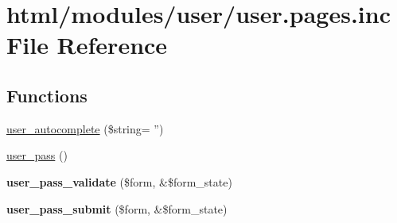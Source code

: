 \hypertarget{user_8pages_8inc}{
\section{html/modules/user/user.pages.inc File Reference}
\label{user_8pages_8inc}
}
\subsection*{Functions}
\begin{DoxyCompactItemize}
\item 
\hyperlink{user_8pages_8inc_a3a77600d6ab7b9af11a3692207b5533a}{user\_\-autocomplete} (\$string= '')
\item 
\hyperlink{group__forms_gad7f952e136ebcff493ca8de7209100cf}{user\_\-pass} ()
\item 
\hypertarget{user_8pages_8inc_a518f9714e8a92fe4ad96560928dba138}{
{\bfseries user\_\-pass\_\-validate} (\$form, \&\$form\_\-state)}
\label{user_8pages_8inc_a518f9714e8a92fe4ad96560928dba138}

\item 
\hypertarget{user_8pages_8inc_ae3bac17377ceac5fa4e81efbe0ebfebf}{
{\bfseries user\_\-pass\_\-submit} (\$form, \&\$form\_\-state)}
\label{user_8pages_8inc_ae3bac17377ceac5fa4e81efbe0ebfebf}


\end{DoxyCompactItemize}
